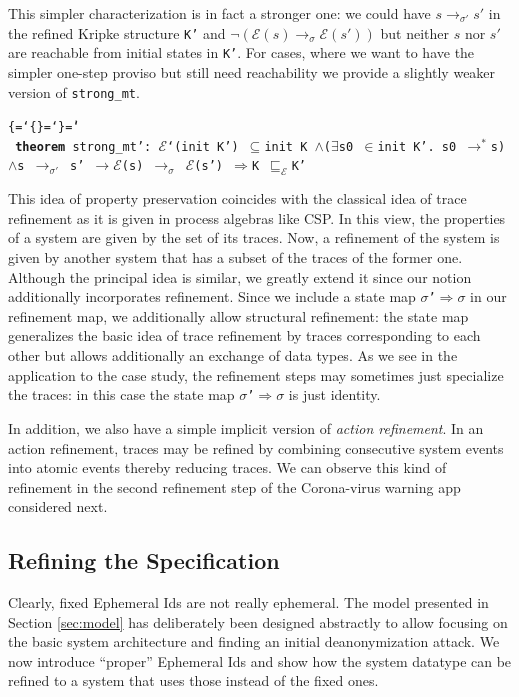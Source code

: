 \documentclass{llncs}
\newenvironment{ttbox}{\begin{alltt}\ttbraces\small\tt}%
                      {\end{alltt}}
\def\ttbraces{\let\.=\nobreak\chardef\{=`\{\chardef\}=`\}\chardef\|=`\\}
\newcommand\ttand{\mbox{{$\land$}}}
\newcommand\ttfun{\mbox{{$\Rightarrow$}}}
\newcommand\ttimp{\mbox{{$\longrightarrow$}}}
\newcommand\ttexists{\mbox{{$\exists$}}}
\newcommand\ttin{\mbox{{$\in$}}}
\newcommand\ttImp{\mbox{{$\Longrightarrow$}}}
\newcommand\ttrelIstar{\mbox{{$\to^*$}}}
\newcommand\ttrel[1]{\mbox{{$\to_{#1}$}}}
\newcommand\ttsubseteq{\mbox{{$\subseteq$}}}
\newcommand\ttsigma{\mbox{{$\sigma$}}}
\newcommand\ttmref[1]{\mbox{{$\sqsubseteq_{#1}$}}}
\newcommand\ttmeref{\ttmref{\mathcal{E}}}
\newcommand\ttecal{\mbox{$\mathcal{E}$}}
\newcommand\ttimg{\mbox{\texttt{`}}}
\begin{document}
This simpler characterization is in fact a stronger one: we could have $s \ttrel{\sigma'} s'$ 
in the refined Kripke structure \texttt{K'} and $\neg(\ttecal(s) \ttrel{\sigma} \ttecal(s'))$
but neither $s$ nor $s'$ are reachable from initial states in \texttt{K'}.
For cases, where we want to have the simpler one-step proviso but still need 
reachability we provide a slightly weaker version of \texttt{strong\_mt}.
\begin{ttbox}
{\bf{theorem}} strong_mt':  
\ttecal\ttimg(init K') \ttsubseteq init K \ttand (\ttexists s0 \ttin init K'. s0  \ttrelIstar s)
 \ttand s \ttrel{\sigma'} s' \ttimp \ttecal(s) \ttrel{\sigma} \ttecal(s') \ttImp K \ttmeref K'
\end{ttbox}
This idea of property preservation coincides with the classical idea of
trace refinement as it is given in process algebras like CSP. In this view,
the properties of a system are given by the set of its traces. Now, a refinement
of the system is given by another system that has a subset of the traces of the 
former one.
Although the principal idea is similar, we greatly extend it since our notion
additionally incorporates refinement. Since we include a state map 
\texttt{\ttsigma'\ttfun \ttsigma} in our refinement map, we additionally
allow structural refinement: the state map generalizes the basic idea of
trace refinement by traces corresponding to each other but allows additionally
an exchange of data types. 
As we see in the application to the case study, the refinement steps may
sometimes just specialize the traces: in this case the state map 
\texttt{\ttsigma'\ttfun \ttsigma} is just identity. 

In addition, we also have a simple implicit version of {\it action refinement}. In an
action refinement, traces may be refined by combining consecutive system events
into atomic events thereby reducing traces.
We can observe this kind of refinement in the second refinement step
of the Corona-virus warning app considered next.

\subsection{Refining the Specification}
\label{sec:corref}
Clearly, fixed Ephemeral Ids are not really ephemeral. The model presented
in Section \ref{sec:model} has deliberately been designed abstractly to allow focusing on
the basic system architecture and finding an initial deanonymization attack.
We now introduce ``proper'' Ephemeral Ids and show how the system datatype can be refined to a system
that uses those instead of the fixed ones.
\end{document}
